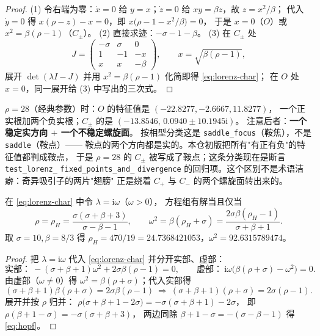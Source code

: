 \begin{proof}
(1) 令右端为零：$\dot x=0$ 给 $y=x$；$\dot z=0$ 给 $xy=\beta z$，故 $z=x^2/\beta$；
代入 $\dot y=0$ 得 $x(\rho-z)-x=0$，即 $x\bigl(\rho-1-x^2/\beta\bigr)=0$，
于是 $x=0$（$O$）或 $x^2=\beta(\rho-1)$（$C_\pm$）。
(2) 直接求迹：$-\sigma-1-\beta$。
(3) 在 $C_\pm$ 处
\[
  J=\begin{pmatrix}-\sigma&\sigma&0\\ 1&-1&-x\\ x&x&-\beta\end{pmatrix},
  \qquad x=\sqrt{\beta(\rho-1)},
\]
展开 $\det(\lambda I-J)$ 并用 $x^2=\beta(\rho-1)$ 化简即得 \eqref{eq:lorenz-char}；
在 $O$ 处 $x=0$，同一展开给 (3) 中写出的三次式。
\end{proof}

$\rho=28$（经典参数）时：$O$ 的特征值是 $(-22.8277,-2.6667,11.8277)$，
一个正实根加两个负实根；$C_\pm$ 的是 $(-13.8546,\,0.0940\pm10.1945\mathrm{i})$。
注意后者：\textbf{一个稳定实方向 $+$ 一个不稳定螺旋面}。
按相型分类这是 \texttt{saddle\_focus}（鞍焦），不是 \texttt{saddle}（鞍点）——
鞍点的两个方向都是实的。本仓初版把所有"有正有负"的特征值都判成鞍点，
于是 $\rho=28$ 的 $C_\pm$ 被写成了鞍点；这条分类现在是断言 \texttt{test\_lorenz\_}\allowbreak
\texttt{fixed\_}\allowbreak\texttt{points\_}\allowbreak\texttt{and\_}\allowbreak
\texttt{divergence} 的回归项。这个区别不是术语洁癖：奇异吸引子的两片"翅膀"
正是绕着 $C_+$ 与 $C_-$ 的两个螺旋面转出来的。

\begin{theorem}[Hopf 阈值 $\rho_H=470/19$]
\label{thm:lorenz-hopf}
在 \eqref{eq:lorenz-char} 中令 $\lambda=\mathrm{i}\omega$（$\omega>0$），
方程组有解当且仅当
\begin{equation}
  \rho=\rho_H=\frac{\sigma(\sigma+\beta+3)}{\sigma-\beta-1},\qquad
  \omega^2=\beta(\rho_H+\sigma)=\frac{2\sigma\beta(\rho_H-1)}{\sigma+\beta+1}.
  \label{eq:hopf}
\end{equation}
取 $\sigma=10,\beta=8/3$ 得 $\rho_H=470/19=24.7368421053$，$\omega^2=92.6315789474$。
\end{theorem}

\begin{proof}
把 $\lambda=\mathrm{i}\omega$ 代入 \eqref{eq:lorenz-char} 并分开实部、虚部：
\[
  \text{实部：}\ -(\sigma+\beta+1)\omega^2+2\sigma\beta(\rho-1)=0,
  \qquad
  \text{虚部：}\ \mathrm{i}\omega\bigl(\beta(\rho+\sigma)-\omega^2\bigr)=0 .
\]
由虚部（$\omega\ne0$）得 $\omega^2=\beta(\rho+\sigma)$；代入实部得
\[
  (\sigma+\beta+1)\beta(\rho+\sigma)=2\sigma\beta(\rho-1)
  \ \Longrightarrow\
  (\sigma+\beta+1)(\rho+\sigma)=2\sigma(\rho-1).
\]
展开并按 $\rho$ 归并：
$\rho\bigl(\sigma+\beta+1-2\sigma\bigr)=-\sigma(\sigma+\beta+1)-2\sigma$，
即 $\rho(\beta+1-\sigma)=-\sigma(\sigma+\beta+3)$，
两边同除 $\beta+1-\sigma=-(\sigma-\beta-1)$ 得 \eqref{eq:hopf}。
\end{proof}

